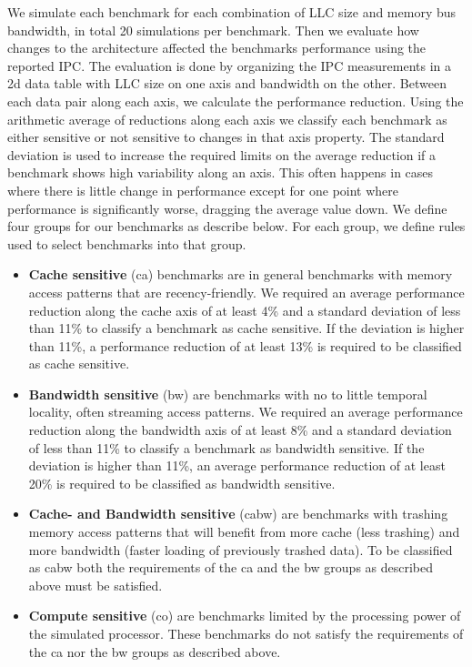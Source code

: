 We simulate each benchmark for each combination of LLC size and memory bus bandwidth, in total 20 simulations per benchmark.
Then we evaluate how changes to the architecture affected the benchmarks performance using the reported IPC.
The evaluation is done by organizing the IPC measurements in a 2d data table with LLC size on one axis and bandwidth on the other.
Between each data pair along each axis, we calculate the performance reduction.
Using the arithmetic average of reductions along each axis we classify each benchmark as either sensitive or not sensitive to changes in that axis property.
The standard deviation is used to increase the required limits on the average reduction if a benchmark shows high variability along an axis.
This often happens in cases where there is little change in performance except for one point where performance is significantly worse, dragging the average value down.
We define four groups for our benchmarks as describe below.
For each group, we define rules used to select benchmarks into that group.
\begin{itemize}

\item \textbf{Cache sensitive} (ca) benchmarks are in general benchmarks with memory access patterns that are recency-friendly. We required an average performance reduction along the cache axis of at least 4\% and a standard deviation of less than 11\% to classify a benchmark as cache sensitive. If the deviation is higher than 11\%, a performance reduction of at least 13\% is required to be classified as cache sensitive.

\item \textbf{Bandwidth sensitive} (bw) are benchmarks with no to little temporal locality, often streaming access patterns. We required an average performance reduction along the bandwidth axis of at least 8\% and a standard deviation of less than 11\% to classify a benchmark as bandwidth sensitive. If the deviation is higher than 11\%, an average performance reduction of at least 20\% is required to be classified as bandwidth sensitive. 

\item \textbf{Cache- and Bandwidth sensitive} (cabw) are benchmarks with trashing memory access patterns that will benefit from more cache (less trashing) and more bandwidth (faster loading of previously trashed data). To be classified as cabw both the requirements of the ca and the bw groups as described above must be satisfied.

\item \textbf{Compute sensitive} (co) are benchmarks limited by the processing power of the simulated processor. These benchmarks do not satisfy the requirements of the ca nor the bw groups as described above.

\end{itemize}

